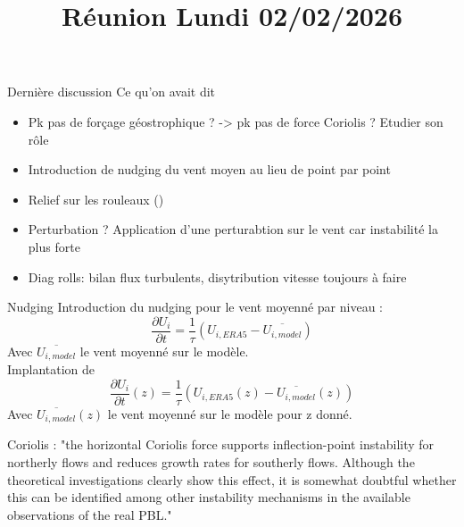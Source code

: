 

\graphicspath{{FIGURES/}}

\title{Réunion Lundi 02/02/2026}
\author{}

\usepackage[caption = false]{subfig}

\begin{frame}
\maketitle
\end{frame}

\begin{frame}{Dernière discussion}
Ce qu'on avait dit
  \begin{itemize}
    \item Pk pas de forçage géostrophique ? -> pk pas de force Coriolis ? Etudier son rôle
    \item Introduction de nudging du vent moyen au lieu de point par point
    \item Relief sur les rouleaux (\cite{swathiUniqueRollClouds2025})
    \item Perturbation ? Application d'une perturabtion sur le vent car instabilité la plus forte
    \item Diag rolls: bilan flux turbulents, disytribution vitesse toujours à faire 
  \end{itemize}
\end{frame}

\begin{frame}{Nudging}
Introduction du nudging pour le vent moyenné par niveau : 
\begin{equation}
\frac{\partial U_i}{\partial t} = \frac{1}{\tau}\left(U_{i, ERA5} - \overline{U_{i,model}}\right)
\end{equation}
Avec $\overline{U_{i,model}}$ le vent moyenné sur le modèle. \\
Implantation de 
\begin{equation}
\frac{\partial U_i}{\partial t}(z) = \frac{1}{\tau}\left(U_{i, ERA5}(z) - \overline{U_{i,model}}(z)\right)
\end{equation}
Avec $\overline{U_{i,model}}(z)$ le vent moyenné sur le modèle pour z donné. \\
\end{frame}


\begin{frame}{Coriolis}
  \cite{Etling} : "the horizontal Coriolis force supports inflection-point instability for northerly flows and reduces growth rates for southerly flows. Although the theoretical investigations clearly show this effect, it is somewhat doubtful whether this can be identified among other instability mechanisms in the available observations of the real PBL."
\end{frame} 

